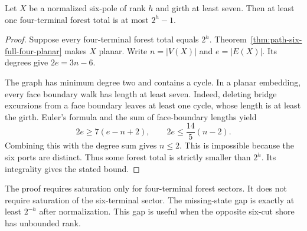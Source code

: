 \begin{corollary}
\label{cor:path-six-girth-seven-missing-state}
Let $X$ be a normalized six-pole of rank $h$ and girth at least seven.
Then at least one four-terminal forest total is at most $2^h-1$.
\end{corollary}

\begin{proof}
Suppose every four-terminal forest total equals $2^h$.
Theorem~\ref{thm:path-six-full-four-planar} makes $X$ planar.
Write $n=|V(X)|$ and $e=|E(X)|$.
Its degrees give $2e=3n-6$.

The graph has minimum degree two and contains a cycle.
In a planar embedding, every face boundary walk has length at least seven.
Indeed, deleting bridge excursions from a face boundary leaves at least one cycle, whose length is at least the girth.
Euler's formula and the sum of face-boundary lengths yield
\[
 2e\ge7(e-n+2),\qquad
 2e\le\frac{14}{5}(n-2).
\]
Combining this with the degree sum gives $n\le2$.
This is impossible because the six ports are distinct.
Thus some forest total is strictly smaller than $2^h$.
Its integrality gives the stated bound.
\end{proof}

The proof requires saturation only for four-terminal forest sectors.
It does not require saturation of the six-terminal sector.
The missing-state gap is exactly at least $2^{-h}$ after normalization.
This gap is useful when the opposite six-cut shore has unbounded rank.

